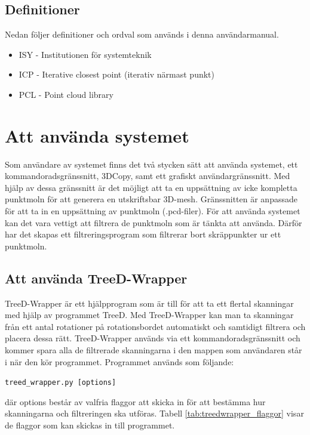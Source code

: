 \documentclass[a4paper,titlepage,12pt]{article}
\begin{document}
	\subsection{Definitioner}
		Nedan följer definitioner och ordval som används i denna användarmanual.
		
		\begin{itemize}
			\item ISY - Institutionen för systemteknik
			\item ICP - Iterative closest point (iterativ närmast punkt)
			\item PCL - Point cloud library
		\end{itemize}
    
\newpage  

\section{Att använda systemet}
	Som användare av systemet finns det två stycken sätt att använda systemet, ett kommandoradsgränssnitt, 3DCopy, samt ett grafiskt användargränssnitt. Med hjälp av dessa gränssnitt är det möjligt att ta en uppsättning av icke kompletta punktmoln för att generera en utskriftsbar 3D-mesh. Gränssnitten är anpassade för att ta in en uppsättning av punktmoln (.pcd-filer). För att använda systemet kan det vara vettigt att filtrera de punktmoln som är tänkta att använda. Därför har det skapas ett filtreringsprogram som filtrerar bort skräppunkter ur ett punktmoln.
	
	\subsection{Att använda TreeD-Wrapper}
	TreeD-Wrapper är ett hjälpprogram som är till för att ta ett flertal skanningar med hjälp av programmet TreeD. Med TreeD-Wrapper kan man ta skanningar från ett antal rotationer på rotationsbordet automatiskt och samtidigt filtrera och placera dessa rätt. TreeD-Wrapper används via ett kommandoradsgränssnitt och kommer spara alla de filtrerade skanningarna i den mappen som användaren står i när den kör programmet. Programmet används som följande:
	
	\texttt{treed\_wrapper.py [options]}
	
	där options består av valfria flaggor att skicka in för att bestämma hur skanningarna och filtreringen ska utföras. Tabell \ref{tab:treedwrapper_flaggor} visar de flaggor som kan skickas in till programmet.
	
\end{document}
